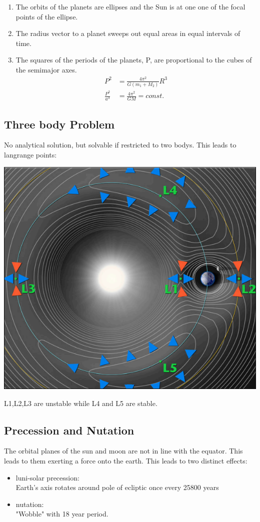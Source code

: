 \documentclass[11pt,a4paper]{article}
\begin{document}
\begin{enumerate}
    \item The orbits of the planets are ellipses and the Sun is at
one one of the focal points of the ellipse. 
\item The radius vector to a planet sweeps out equal areas
in equal intervals of time. 
\item The squares of the periods of the planets, P, are proportional to the cubes of the semimajor axes.
    \begin{align*}
        P^2 &= \frac{4 \pi^2}{G (m_1 +M_2)} R^3 \\ 
        \frac {P^2}{ a^3} &= \frac {4 \pi ^2 } {GM} = const.
    \end{align*}
\end{enumerate}
\subsection{Three body Problem}
No analytical solution, but solvable if restricted to two bodys.
This leads to langrange points:
\begin{center}
\includegraphics[width=0.5\linewidth]{screenshot_2024-01-14-183945.png}\\
\end{center}
L1,L2,L3 are unstable while L4 and L5 are stable.
\subsection{Precession and Nutation}
The orbital planes of the sun and moon are not in line with the equator.
This leads to them exerting a force onto the earth. 
This leads to two distinct effects: 
\begin{itemize}
    \item luni-solar precession: \\ 
        Earth’s axis rotates around pole of ecliptic once every
25800 years
\item nutation: \\ 
    "Wobble" with 18 year period.
\end{itemize}
\end{document}
